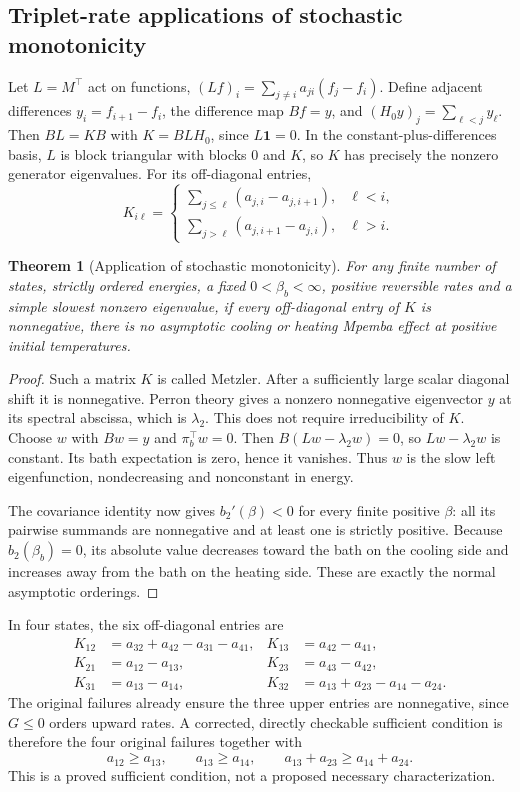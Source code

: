 \documentclass[11pt]{article}
\newtheorem{theorem}{Theorem}
\begin{document}
\subsection{Triplet-rate applications of stochastic monotonicity}
Let $L=M^\top$ act on functions, $(Lf)_i=\sum_{j\ne i}a_{ji}(f_j-f_i)$. Define adjacent differences $y_i=f_{i+1}-f_i$, the difference map $Bf=y$, and $(H_0y)_j=\sum_{\ell<j}y_\ell$. Then $BL=KB$ with $K=BLH_0$, since $L\mathbf1=0$. In the constant-plus-differences basis, $L$ is block triangular with blocks 0 and $K$, so $K$ has precisely the nonzero generator eigenvalues. For its off-diagonal entries,
\[
K_{i\ell}=\begin{cases}
\sum_{j\leq\ell}(a_{j,i}-a_{j,i+1}),&\ell<i,\\
\sum_{j>\ell}(a_{j,i+1}-a_{j,i}),&\ell>i.
\end{cases}
\]
\begin{theorem}[Application of stochastic monotonicity]
For any finite number of states, strictly ordered energies, a fixed $0<\beta_b<\infty$, positive reversible rates and a simple slowest nonzero eigenvalue, if every off-diagonal entry of $K$ is nonnegative, there is no asymptotic cooling or heating Mpemba effect at positive initial temperatures.
\end{theorem}
\begin{proof}
Such a matrix $K$ is called Metzler. After a sufficiently large scalar diagonal shift it is nonnegative. Perron theory gives a nonzero nonnegative eigenvector $y$ at its spectral abscissa, which is $\lambda_2$. This does not require irreducibility of $K$. Choose $w$ with $Bw=y$ and $\pi_b^\top w=0$. Then $B(Lw-\lambda_2w)=0$, so $Lw-\lambda_2w$ is constant. Its bath expectation is zero, hence it vanishes. Thus $w$ is the slow left eigenfunction, nondecreasing and nonconstant in energy.

The covariance identity now gives $b_2'(\beta)<0$ for every finite positive $\beta$: all its pairwise summands are nonnegative and at least one is strictly positive. Because $b_2(\beta_b)=0$, its absolute value decreases toward the bath on the cooling side and increases away from the bath on the heating side. These are exactly the normal asymptotic orderings.
\end{proof}
In four states, the six off-diagonal entries are
\begin{align*}
K_{12}&=a_{32}+a_{42}-a_{31}-a_{41},&K_{13}&=a_{42}-a_{41},\\
K_{21}&=a_{12}-a_{13},&K_{23}&=a_{43}-a_{42},\\
K_{31}&=a_{13}-a_{14},&K_{32}&=a_{13}+a_{23}-a_{14}-a_{24}.
\end{align*}
The original failures already ensure the three upper entries are nonnegative, since $G\leq0$ orders upward rates. A corrected, directly checkable sufficient condition is therefore the four original failures together with
\[
a_{12}\geq a_{13},\qquad a_{13}\geq a_{14},\qquad
 a_{13}+a_{23}\geq a_{14}+a_{24}.
\]
This is a proved sufficient condition, not a proposed necessary characterization.
\end{document}
